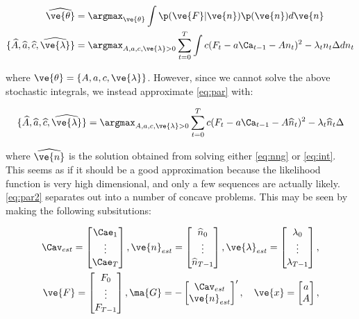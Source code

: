 \documentclass[12pt]{article}
\begin{document}
\begin{align} \label{eq:par}
\widehat{\ve{\theta}} &= \argmax_{\ve{\theta}} \int \p(\ve{F}|\ve{n}) \p(\ve{n}) d\ve{n} \\
\{\widehat{A},\widehat{a},\widehat{c},\widehat{\ve{\lambda}}\} &= \argmax_{A,a,c,\ve{\lambda} > 0} \sum_{t=0}^T \int c(F_t - a \Ca_{t-1} - A n_t)^2 - \lambda_t n_t \Delta  dn_t
\end{align}

\noindent where $\ve{\theta}=\{A,a,c,\ve{\lambda}\}$. However, since we cannot solve the above stochastic integrals, we instead approximate \eqref{eq:par} with:

\begin{align} \label{eq:par2}
\{\widehat{A},\widehat{a},\widehat{c},\widehat{\ve{\lambda}}\} = \argmax_{A,a,c,\ve{\lambda} > 0} \sum_{t=0}^T c(F_t - a
\Ca_{t-1} - A \widehat{n}_t)^2 - \lambda_t \widehat{n}_t \Delta  
\end{align}

\noindent where $\widehat{\ve{n}}$ is the solution obtained from solving either \eqref{eq:nng} or \eqref{eq:int}.  This seems as if it should be a good approximation because the likelihood function is very high dimensional, and only a few sequences are actually likely. \eqref{eq:par2} separates out into a number of concave problems.  This may be seen by making the following subsitutions:

\begin{align*}
\Cav_{est} =\begin{bmatrix} \Cae_1\\ \vdots \\ \Cae_T \end{bmatrix},
\ve{n}_{est}=\begin{bmatrix} \widehat{n}_0\\ \vdots \\ \widehat{n}_{T-1} \end{bmatrix},
\ve{\lambda}_{est}=\begin{bmatrix} \lambda_0\\ \vdots \\ \lambda_{T-1} \end{bmatrix},
\\ \ve{F}=\begin{bmatrix} F_0\\ \vdots \\ F_{T-1} \end{bmatrix},
\ma{G}=-\begin{bmatrix} \Cav_{est}\\ \ve{n}_{est} \end{bmatrix}',
\quad \ve{x}=\begin{bmatrix} a\\ A \end{bmatrix},
\end{align*}
\end{document}
